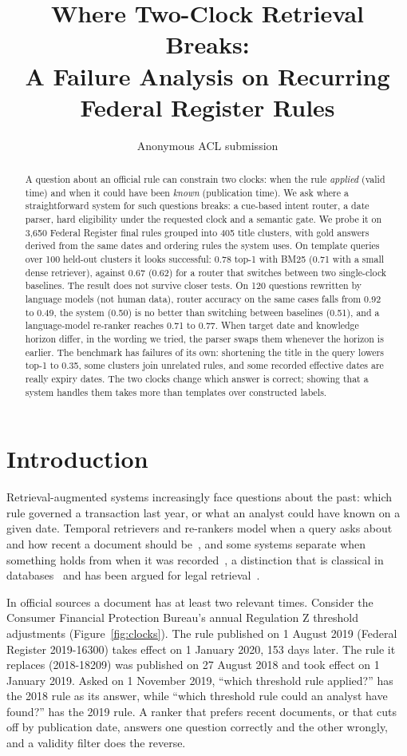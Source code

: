 \documentclass[11pt]{article}
\title{Where Two-Clock Retrieval Breaks: \\ A Failure Analysis on Recurring Federal Register Rules}
\author{Anonymous ACL submission}
\begin{document}
\maketitle
\begin{abstract}
A question about an official rule can constrain two clocks: when the rule \emph{applied} (valid time) and when it could have been \emph{known} (publication time). We ask where a straightforward system for such questions breaks: a cue-based intent router, a date parser, hard eligibility under the requested clock and a semantic gate. We probe it on 3{,}650 Federal Register final rules grouped into 405 title clusters, with gold answers derived from the same dates and ordering rules the system uses. On template queries over 100 held-out clusters it looks successful: 0.78 top-1 with BM25 (0.71 with a small dense retriever), against 0.67 (0.62) for a router that switches between two single-clock baselines. The result does not survive closer tests. On 120 questions rewritten by language models (not human data), router accuracy on the same cases falls from 0.92 to 0.49, the system (0.50) is no better than switching between baselines (0.51), and a language-model re-ranker reaches 0.71 to 0.77. When target date and knowledge horizon differ, in the wording we tried, the parser swaps them whenever the horizon is earlier. The benchmark has failures of its own: shortening the title in the query lowers top-1 to 0.35, some clusters join unrelated rules, and some recorded effective dates are really expiry dates. The two clocks change which answer is correct; showing that a system handles them takes more than templates over constructed labels.
\end{abstract}

\section{Introduction}
Retrieval-augmented systems increasingly face questions about the past: which rule governed a transaction last year, or what an analyst could have known on a given date. Temporal retrievers and re-rankers model when a query asks about and how recent a document should be~\cite{qtie2026,re32025}, and some systems separate when something holds from when it was recorded~\cite{timelyrag2026,niksarli2026}, a distinction that is classical in databases~\cite{jensen1996} and has been argued for legal retrieval~\cite{demartim2026}.

In official sources a document has at least two relevant times. Consider the Consumer Financial Protection Bureau's annual Regulation Z threshold adjustments (Figure~\ref{fig:clocks}). The rule published on 1 August 2019 (Federal Register 2019-16300) takes effect on 1 January 2020, 153 days later. The rule it replaces (2018-18209) was published on 27 August 2018 and took effect on 1 January 2019. Asked on 1 November 2019, ``which threshold rule applied?'' has the 2018 rule as its answer, while ``which threshold rule could an analyst have found?'' has the 2019 rule. A ranker that prefers recent documents, or that cuts off by publication date, answers one question correctly and the other wrongly, and a validity filter does the reverse.
\end{document}
